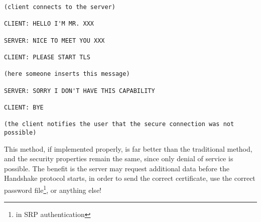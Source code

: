 \begin{verbatim}
(client connects to the server)

CLIENT: HELLO I'M MR. XXX

SERVER: NICE TO MEET YOU XXX

CLIENT: PLEASE START TLS

(here someone inserts this message)

SERVER: SORRY I DON'T HAVE THIS CAPABILITY

CLIENT: BYE

(the client notifies the user that the secure connection was not possible)

\end{verbatim}


\par
This method, if implemented properly, is far better than the
traditional method, and the security properties remain the same, since only
denial of service is possible. The benefit is the server may request
additional data before the \tls{} Handshake protocol
starts, in order to send the correct certificate, use the correct
password file\footnote{in SRP authentication}, or anything else!


